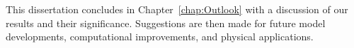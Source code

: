 

This dissertation concludes in Chapter~\ref{chap:Outlook} with a discussion of our results and their significance. Suggestions are then made for future model developments, computational improvements, and physical applications.
